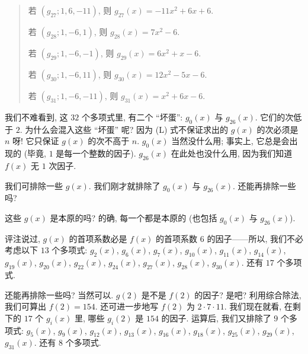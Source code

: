 \begin{example}
\begin{quotation}
        若 $(g_{27}; 1, 6, -11)$, 则 $g_{27} (x) = -11 x^2+6 x+6$.

        若 $(g_{28}; 1, -6, 1)$, 则 $g_{28} (x) = 7 x^2-6$.

        若 $(g_{29}; 1, -6, -1)$, 则 $g_{29} (x) = 6 x^2+x-6$.

        若 $(g_{30}; 1, -6, 11)$, 则 $g_{30} (x) = 12 x^2-5 x-6$.

        若 $(g_{31}; 1, -6, -11)$, 则 $g_{31} (x) = x^2+6 x-6$.
    \end{quotation}

    我们不难看到, 这 $32$ 个多项式里, 有二个 ``坏蛋'': $g_0 (x)$ 与 $g_{26} (x)$. 它们的次低于 $2$. 为什么会混入这些 ``坏蛋'' 呢? 因为 (L) 式不保证求出的 $g(x)$ 的次必须是 $n$ 呀! 它只保证 $g(x)$ 的次不高于 $n$. $g_0 (x)$ 当然没什么用; 事实上, 它总是会出现的 (毕竟, $1$ 是每一个整数的因子). $g_{26} (x)$ 在此处也没什么用, 因为我们知道 $f(x)$ 无 $1$ 次因子.

    我们可排除一些 $g(x)$. 我们刚才就排除了 $g_0 (x)$ 与 $g_{26} (x)$. 还能再排除一些吗?

    这些 $g(x)$ 是本原的吗? 的确, 每一个都是本原的 (也包括 $g_0 (x)$ 与 $g_{26} (x)$).

    评注说过, $g(x)$ 的首项系数必是 $f(x)$ 的首项系数 $6$ 的因子——所以, 我们不必考虑以下 $13$ 个多项式: $g_2 (x)$, $g_6 (x)$, $g_7 (x)$, $g_{10} (x)$, $g_{11} (x)$, $g_{14} (x)$, $g_{19} (x)$, $g_{20} (x)$, $g_{22} (x)$, $g_{24} (x)$, $g_{27} (x)$, $g_{28} (x)$, $g_{30} (x)$. 还有 $17$ 个多项式.

    还能再排除一些吗? 当然可以. $g(2)$ 是不是 $f(2)$ 的因子? 是吧? 利用综合除法, 我们可算出 $f(2) = 154$. 还可进一步地写 $f(2)$ 为 $2 \cdot 7 \cdot 11$. 我们现在就看, 在剩下的 $17$ 个 $g_i (x)$ 里, 哪些 $g_i (2)$ 是 $154$ 的因子. 运算后, 我们又排除了 $9$ 个多项式: $g_5 (x)$, $g_9 (x)$, $g_{12} (x)$, $g_{13} (x)$, $g_{16} (x)$, $g_{18} (x)$, $g_{25} (x)$, $g_{29} (x)$, $g_{31} (x)$. 还有 $8$ 个多项式.


\end{example}
